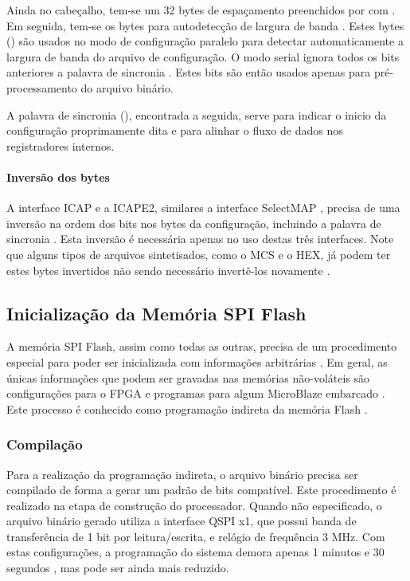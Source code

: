 \documentclass[11pt,a4paper,oneside]{book}
\begin{document}
Ainda no cabeçalho, tem-se um 32 bytes de espaçamento preenchidos por com .
Em seguida, tem-se os bytes para autodetecção de largura de banda \cite{ug470, xapp583}.
Estes bytes () são usados no modo de configuração paralelo para detectar automaticamente a largura de banda do arquivo de configuração.
O modo serial ignora todos os bits anteriores a palavra de sincronia \cite{xapp583}.
Estes bits são então usados apenas para pré-processamento do arquivo binário.

A palavra de sincronia (), encontrada a seguida, serve para indicar o inicio da configuração proprimamente dita e para alinhar o fluxo de dados nos registradores internos.

\paragraph{Inversão dos bytes} A interface ICAP e a ICAPE2, similares a interface SelectMAP \cite{wp374}, precisa de uma inversão na ordem dos bits nos bytes da configuração, incluindo a palavra de sincronia \cite{xapp502}.
Esta inversão é necessária apenas no uso destas três interfaces.
Note que alguns tipos de arquivos sintetisados, como o MCS e o HEX, já podem ter estes bytes invertidos não sendo necessário invertê-los novamente \cite{ug470}.

\subsection{Inicialização da Memória SPI Flash}
A memória SPI Flash, assim como todas as outras, precisa de um procedimento especial para poder ser inicializada com informações arbitrárias \cite{xapp694}.
Em geral, as únicas informações que podem ser gravadas nas memórias não-voláteis são configurações para o FPGA e programas para algum MicroBlaze embarcado \cite{ug111}.
Este processo é conhecido como programação indireta da memória Flash \cite{xapp586}.

\subsubsection{Compilação} Para a realização da programação indireta, o arquivo binário precisa ser compilado de forma a gerar um padrão de bits compatível.
Este procedimento é realizado na etapa de construção do processador.
Quando não especificado, o arquivo binário gerado utiliza a interface QSPI x1, que possui banda de transferência de 1 bit por leitura/escrita,  e relógio de frequência 3 MHz.
Com estas configurações, a programação do sistema demora apenas 1 minutos e 30 segundos \cite{xapp586}, mas pode ser ainda mais reduzido.
\end{document}
